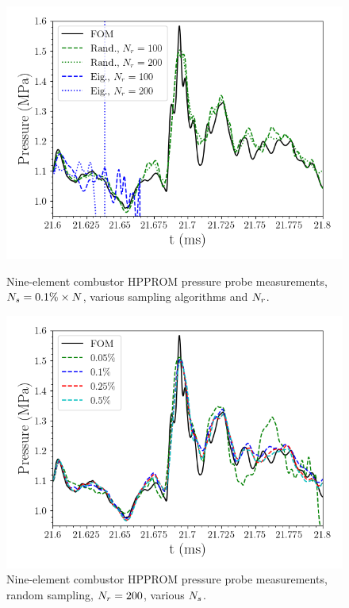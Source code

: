 \begin{figure}
	\begin{minipage}{0.49\linewidth}
		\includegraphics[width=0.99\linewidth]{Chapters/HPROMResults/Images/nineElem/deim/pressure_probe_deim_algs.png}
		\caption{\label{fig:nineElemDEIMProbeAlgo}Nine-element combustor HPPROM pressure probe measurements, $N_s = 0.1\% \times N$, various sampling algorithms and $N_r$.}
	\end{minipage}
	\begin{minipage}{0.49\linewidth}
		\includegraphics[width=0.99\linewidth]{Chapters/HPROMResults/Images/nineElem/deim/pressure_probe_deim_random_samp.png}
		\caption{\label{fig:nineElemDEIMProbeSamp}Nine-element combustor HPPROM pressure probe measurements, random sampling, $N_r = 200$, various $N_s$.}
	\end{minipage}
\end{figure}

